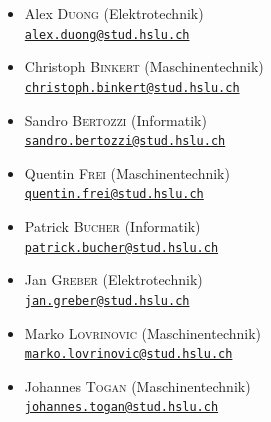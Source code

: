 \begin{multicols}{2}
\begin{itemize}
    \item Alex \textsc{Duong} (Elektrotechnik)\\ \href{mailto:alex.duong@stud.hslu.ch}{\texttt{alex.duong@stud.hslu.ch}}
    \item Christoph \textsc{Binkert} (Maschinentechnik)\\ \href{mailto:christoph.binkert@stud.hslu.ch}{\texttt{christoph.binkert@stud.hslu.ch}}
    \item Sandro \textsc{Bertozzi} (Informatik)\\ \href{mailto:sandro.bertozzi@stud.hslu.ch}{\texttt{sandro.bertozzi@stud.hslu.ch}}
    \item Quentin \textsc{Frei} (Maschinentechnik)\\ \href{mailto:quentin.frei@stud.hslu.ch}{\texttt{quentin.frei@stud.hslu.ch}}
\end{itemize}
\columnbreak
\begin{itemize}
    \item Patrick \textsc{Bucher} (Informatik)\\ \href{mailto:patrick.bucher@stud.hslu.ch}{\texttt{patrick.bucher@stud.hslu.ch}}
    \item Jan \textsc{Greber} (Elektrotechnik)\\ \href{mailto:jan.greber@stud.hslu.ch}{\texttt{jan.greber@stud.hslu.ch}}
    \item Marko \textsc{Lovrinovic} (Maschinentechnik)\\ \href{mailto:marko.lovrinovic@stud.hslu.ch}{\texttt{marko.lovrinovic@stud.hslu.ch}}
    \item Johannes \textsc{Togan} (Maschinentechnik)\\ \href{mailto:johannes.togan@stud.hslu.ch}{\texttt{johannes.togan@stud.hslu.ch}}
\end{itemize}
\end{multicols}

